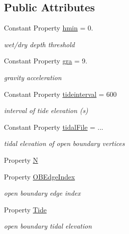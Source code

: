\subsection*{Public Attributes}
\begin{DoxyCompactItemize}
\item 
Constant Property \hyperlink{class_sanya_a20e4c22347d98ed14123bf7963178cf2}{hmin} = 0.
\begin{DoxyCompactList}\small\item\em wet/dry depth threshold \end{DoxyCompactList}\item 
Constant Property \hyperlink{class_sanya_aabe93aa8cfbddb9ee73ff30a537853bf}{gra} = 9.
\begin{DoxyCompactList}\small\item\em gravity acceleration \end{DoxyCompactList}\item 
Constant Property \hyperlink{class_sanya_a55795de68414b87102507f87e6ad6af0}{tideinterval} = 600
\begin{DoxyCompactList}\small\item\em interval of tide elevation (s) \end{DoxyCompactList}\item 
Constant Property \hyperlink{class_sanya_ae6488393d6dd7f772f0050df1da2cb47}{tidal\+File} = ...
\begin{DoxyCompactList}\small\item\em tidal elevation of open boundary vertices \end{DoxyCompactList}\item 
Property \hyperlink{class_sanya_a933e9e02d7cd73f9722669a5b9d5b1c5}{N}
\item 
Property \hyperlink{class_sanya_a7905e627e38963365c48713b82083fd8}{O\+B\+Edge\+Index}
\begin{DoxyCompactList}\small\item\em open boundary edge index \end{DoxyCompactList}\item 
Property \hyperlink{class_sanya_a90a8db1cd3e1c55054e6c739361a8511}{Tide}
\begin{DoxyCompactList}\small\item\em open boundary tidal elevation \end{DoxyCompactList}\end{DoxyCompactItemize}
